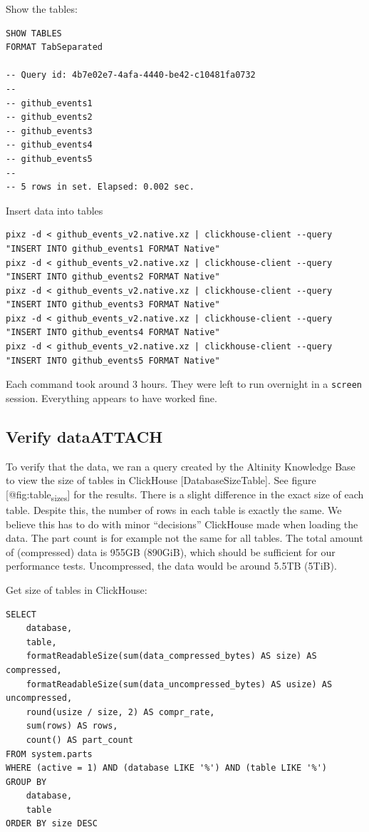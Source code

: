 Show the tables:
\begin{verbatim}
SHOW TABLES
FORMAT TabSeparated

-- Query id: 4b7e02e7-4afa-4440-be42-c10481fa0732
--
-- github_events1
-- github_events2
-- github_events3
-- github_events4
-- github_events5
--
-- 5 rows in set. Elapsed: 0.002 sec.
\end{verbatim}

Insert data into tables
\begin{verbatim}
pixz -d < github_events_v2.native.xz | clickhouse-client --query "INSERT INTO github_events1 FORMAT Native"
pixz -d < github_events_v2.native.xz | clickhouse-client --query "INSERT INTO github_events2 FORMAT Native"
pixz -d < github_events_v2.native.xz | clickhouse-client --query "INSERT INTO github_events3 FORMAT Native"
pixz -d < github_events_v2.native.xz | clickhouse-client --query "INSERT INTO github_events4 FORMAT Native"
pixz -d < github_events_v2.native.xz | clickhouse-client --query "INSERT INTO github_events5 FORMAT Native"
\end{verbatim}

Each command took around 3 hours.
They were left to run overnight in a \texttt{screen} session.
Everything appears to have worked fine.
\subsection{Verify data\hfill{}\textsc{ATTACH}}
\label{sec:org861f597}
To verify that the data, we ran a query created by the Altinity Knowledge Base
to view the size of tables in ClickHouse [DatabaseSizeTable].
See figure [@fig:table\textsubscript{sizes}] for the results.
There is a slight difference in the exact size of each table.
Despite this, the number of rows in each table is exactly the same.
We believe this has to do with minor ``decisions'' ClickHouse made when loading the data.
The part count is for example not the same for all tables.
The total amount of (compressed) data is 955GB (890GiB), which should be sufficient
for our performance tests.
Uncompressed, the data would be around 5.5TB (5TiB).

Get size of tables in ClickHouse:
\begin{verbatim}
SELECT
    database,
    table,
    formatReadableSize(sum(data_compressed_bytes) AS size) AS compressed,
    formatReadableSize(sum(data_uncompressed_bytes) AS usize) AS uncompressed,
    round(usize / size, 2) AS compr_rate,
    sum(rows) AS rows,
    count() AS part_count
FROM system.parts
WHERE (active = 1) AND (database LIKE '%') AND (table LIKE '%')
GROUP BY
    database,
    table
ORDER BY size DESC
\end{verbatim}

